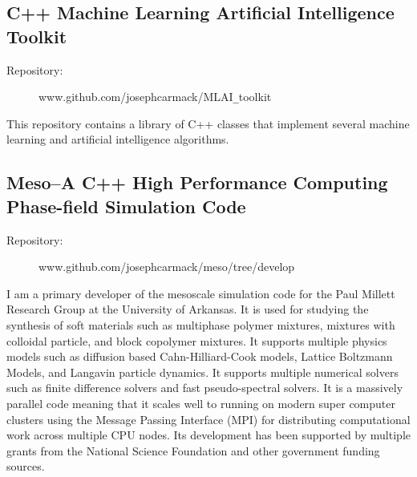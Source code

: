 \documentclass[10pt]{article}
\begin{document}
\subsection{C++ Machine Learning Artificial Intelligence Toolkit}
\begin{description}
    \item[Repository:] www.github.com/josephcarmack/MLAI\texttt{\_}toolkit
\end{description}
This repository contains a library of C++ classes that implement several
machine learning and artificial intelligence algorithms.%

\subsection{Meso--A C++ High Performance Computing Phase-field Simulation Code}
\begin{description}
    \item[Repository:] www.github.com/josephcarmack/meso/tree/develop
\end{description}
I am a primary developer of the mesoscale simulation code for the Paul Millett
Research Group at the University of Arkansas. It is used for studying the
synthesis of soft materials such as multiphase polymer mixtures, mixtures with
colloidal particle, and block copolymer mixtures. It supports multiple physics
models such as diffusion based Cahn-Hilliard-Cook models, Lattice Boltzmann
Models, and Langavin particle dynamics. It supports multiple numerical solvers
such as finite difference solvers and fast pseudo-spectral solvers. It is a
massively parallel code meaning that it scales well to running on modern super
computer clusters using the Message Passing Interface (MPI) for distributing
computational work across multiple CPU nodes. Its development has been
supported by multiple grants from the National Science Foundation and other
government funding sources.
\end{document}
